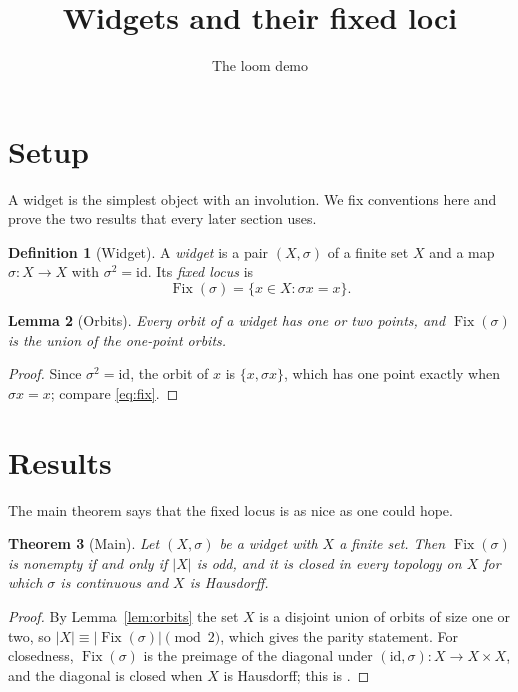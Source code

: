 \documentclass{amsart}
\title{Widgets and their fixed loci}
\author{The loom demo}
\providecommand{\uses}[1]{}
\theoremstyle{plain}
\newtheorem{theorem}{Theorem}[section]
\newtheorem{lemma}[theorem]{Lemma}
\theoremstyle{definition}
\newtheorem{definition}[theorem]{Definition}
\theoremstyle{remark}
\newcommand{\Fix}{\operatorname{Fix}}
\begin{document}
\maketitle

\section{Setup}\label{dm-0010}

A widget is the simplest object with an involution. We fix conventions here and prove the two results that every later section uses.


\begin{definition}[Widget]\label{dm-0001}\label{def:widget}
A \emph{widget} is a pair $(X,\sigma)$ of a finite set $X$ and a map $\sigma\colon X\to X$ with $\sigma^2=\mathrm{id}$. Its \emph{fixed locus} is
\begin{equation}\label{eq:fix}
\Fix(\sigma) = \{x\in X : \sigma x = x\}.
\end{equation}
\end{definition}



\begin{lemma}[Orbits]\label{dm-0002}\label{lem:orbits}
Every orbit of a widget has one or two points, and $\Fix(\sigma)$ is the union of the one-point orbits.
\end{lemma}
\begin{proof}
Since $\sigma^2=\mathrm{id}$, the orbit of $x$ is $\{x,\sigma x\}$, which has one point exactly when $\sigma x = x$; compare \eqref{eq:fix}.
\end{proof}


\section{Results}\label{dm-0011}

The main theorem says that the fixed locus is as nice as one could hope.


\begin{theorem}[Main]\label{dm-0003}
Let $(X,\sigma)$ be a widget with $X$ a finite set. Then $\Fix(\sigma)$ is nonempty if and only if $|X|$ is odd, and it is closed in every topology on $X$ for which $\sigma$ is continuous and $X$ is Hausdorff.
\end{theorem}
\begin{proof}
\uses{dm-0002}
By Lemma~\ref{lem:orbits} the set $X$ is a disjoint union of orbits of size one or two, so $|X| \equiv |\Fix(\sigma)| \pmod 2$, which gives the parity statement. For closedness, $\Fix(\sigma)$ is the preimage of the diagonal under $(\mathrm{id},\sigma)\colon X\to X\times X$, and the diagonal is closed when $X$ is Hausdorff; this is \cite[Proposition 3.2]{Calloway14}.
\end{proof}
\end{document}
